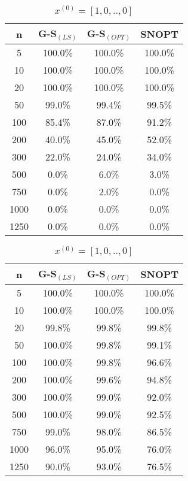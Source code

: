 \begin{table}
\begin{minipage}{.4\linewidth}
\centering
\begin{tabular}{ c | c | c | c }
n &  G-S$_{(LS)}$ & G-S$_{(OPT)}$  & SNOPT \\\hline
5    & 100.0\% & 100.0\% & 100.0\%\\\hline
10   & 100.0\% & 100.0\% & 100.0\%\\\hline
20   & 100.0\% & 100.0\% & 100.0\%\\\hline
50   & 99.0\%  & 99.4\%  & 99.5\%\\\hline
100  & 85.4\%  & 87.0\%  & 91.2\%\\\hline
200  & 40.0\%  & 45.0\%  & 52.0\%\\\hline
300  & 22.0\%  & 24.0\%  & 34.0\%\\\hline
500  & 0.0\%   & 6.0\%   & 3.0\%\\\hline
750  & 0.0\%   & 2.0\%   & 0.0\%\\\hline
1000 & 0.0\%   & 0.0\%   & 0.0\%\\\hline
1250 & 0.0\%   & 0.0\%   & 0.0\%\\\hline
\end{tabular}
\caption{$x^{(0)}_i = \frac{1}{n} \quad \forall i$}
\end{minipage}
\hfill
\begin{minipage}{.4\linewidth}
\centering
\begin{tabular}{ c | c| c | c}
n &  G-S$_{(LS)}$ & G-S$_{(OPT)}$  & SNOPT \\\hline
5    & 100.0\%  & 100.0\% & 100.0\%\\\hline
10   & 100.0\%  & 100.0\% & 100.0\%\\\hline
20   & 99.8\%   & 99.8\%  & 99.8\%\\\hline
50   & 100.0\%  & 99.8\%  & 99.1\%\\\hline
100  & 100.0\%  & 99.8\%  & 96.6\% \\\hline
200  & 100.0\%  & 99.6\%  & 94.8\% \\\hline
300  & 100.0\%  & 99.0\%  & 92.0\% \\\hline
500  & 100.0\%  & 99.0\%  & 92.5\%\\\hline
750  & 99.0\%   & 98.0\%  & 86.5\%\\\hline
1000 & 96.0\%   & 95.0\%  & 76.0\%\\\hline
1250 & 90.0\%   & 93.0\%  & 76.5\%\\\hline
\end{tabular}
\caption{$x^{(0)}= [1, 0, .., 0]$}
\end{minipage}
\end{table}

